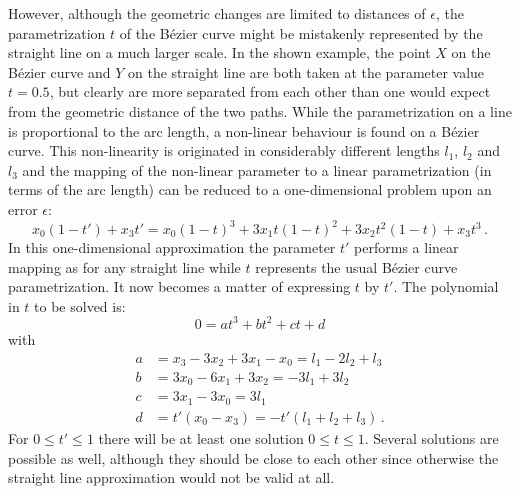 \documentclass{article}
\begin{document}
However, although the geometric changes are limited to distances of
$\epsilon$, the parametrization $t$ of the B\'ezier curve might be
mistakenly represented by the straight line on a much larger scale.
In the shown example, the point $X$ on the B\'ezier curve and $Y$ on
the straight line are both taken at the parameter value $t=0.5$, but
clearly are more separated from each other than one would expect from
the geometric distance of the two paths. While the parametrization on
a line is proportional to the arc length, a non-linear behaviour is
found on a B\'ezier curve. This non-linearity is originated in
considerably different lengths $l_1$, $l_2$ and $l_3$ and the mapping
of the non-linear parameter to a linear parametrization (in terms of
the arc length) can be reduced to a one-dimensional problem upon an
error $\epsilon$:
%
\begin{equation}
  x_0(1-t')+x_3t' = x_0(1-t)^3 + 3x_1t(1-t)^2 + 3x_2t^2(1-t) + x_3 t^3\,.
\end{equation}
%
In this one-dimensional approximation the parameter $t'$ performs a
linear mapping as for any straight line while $t$ represents the usual
B\'ezier curve parametrization. It now becomes a matter of expressing
$t$ by $t'$. The polynomial in $t$ to be solved is:
%
\begin{equation}
  0 = at^3+bt^2+ct+d
\end{equation}
%
with
%
\begin{align}
  a & = x_3-3x_2+3x_1-x_0 = l_1-2l_2+l_3 \\
  b & = 3x_0-6x_1+3x_2 = -3l_1+3l_2 \\
  c & = 3x_1-3x_0 = 3l_1 \\
  d & = t'(x_0-x_3) = -t'(l_1+l_2+l_3)\,.
\end{align}
%
For $0\le t'\le1$ there will be at least one solution $0\le t\le1$.
Several solutions are possible as well, although they should be close
to each other since otherwise the straight line approximation would
not be valid at all.
\end{document}
